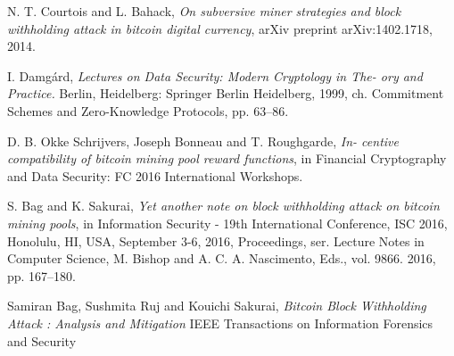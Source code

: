\documentclass[12pt]{article}
\begin{document}
\begin{thebibliography}{9}
 N. T. Courtois and L. Bahack, 
 \textit{On subversive miner strategies and block withholding attack in bitcoin digital currency}, arXiv preprint arXiv:1402.1718, 2014.
 
 I. Damg{\'a}rd, 
 \textit{Lectures on Data Security: Modern Cryptology in The- ory and Practice.} Berlin, Heidelberg: Springer Berlin Heidelberg, 1999, ch. Commitment Schemes and Zero-Knowledge Protocols, pp. 63–86.
 
 D. B. Okke Schrijvers, Joseph Bonneau and T. Roughgarde, 
 \textit{In- centive compatibility of bitcoin mining pool reward functions}, in Financial Cryptography and Data Security: FC 2016 International Workshops.
 
 S. Bag and K. Sakurai, 
 \textit{Yet another note on block withholding attack on bitcoin mining pools}, in Information Security - 19th International Conference, ISC 2016, Honolulu, HI, USA, September 3-6, 2016, Proceedings, ser. Lecture Notes in Computer Science,
 M. Bishop and A. C. A. Nascimento, Eds., vol. 9866. 2016, pp. 167–180.
 
 Samiran Bag, Sushmita Ruj and Kouichi Sakurai,
\textit{Bitcoin Block Withholding Attack : Analysis and
Mitigation}
IEEE Transactions on Information Forensics and Security
\end{thebibliography}
\end{document}
